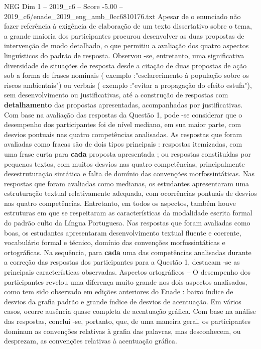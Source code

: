 \begin{textsample}{NEG Dim 1 – 2019\_c6 – Score -5.00 – 2019\_c6/enade\_2019\_eng\_amb\_0cc6810176.txt}
Apesar de o enunciado não fazer referência à exigência de elaboração de um texto dissertativo sobre o tema, a grande maioria dos participantes procurou desenvolver as duas propostas de intervenção de modo detalhado, o que permitiu a avaliação dos quatro aspectos linguísticos do padrão de resposta.
Observou -se, entretanto, uma significativa diversidade de situações de resposta desde a citação de duas propostas de ação sob a forma de frases nominais ( exemplo :"esclarecimento à população sobre os riscos ambientais") ou verbais ( exemplo :"evitar a propagação do efeito estufa"), sem desenvolvimento ou justificativas, até a construção de respostas com \textbf{detalhamento} das propostas apresentadas, acompanhadas por justificativas.
Com base na avaliação das respostas da Questão 1, pode -se considerar que o desempenho dos participantes foi de nível mediano, em sua maior parte, com desvios pontuais nas quatro competências analisadas.
As respostas que foram avaliadas como fracas são de dois tipos principais : respostas itemizadas, com uma frase curta para \textbf{cada} proposta apresentada ; ou respostas constituídas por pequenos textos, com muitos desvios nas quatro competências, principalmente desestruturação sintática e falta de domínio das convenções morfossintáticas.
Nas respostas que foram avaliadas como medianas, os estudantes apresentaram uma estruturação textual relativamente adequada, com ocorrências pontuais de desvios nas quatro competências.
Entretanto, em todos os aspectos, também houve estruturas em que se respeitaram as características da modalidade escrita formal do padrão culto da Língua Portuguesa.
Nas respostas que foram avaliadas como boas, os estudantes apresentaram desenvolvimento textual fluente e coerente, vocabulário formal e técnico, domínio das convenções morfossintáticas e ortográficas.
Na sequência, para \textbf{cada} uma das competências analisadas durante a correção das respostas dos participantes para a Questão 1, destacam -se as principais características observadas.
Aspectos ortográficos – O desempenho dos participantes revelou uma diferença muito grande nos dois aspectos analisados, como tem sido observado em edições anteriores do Enade : baixo índice de desvios da grafia padrão e grande índice de desvios de acentuação.
Em vários casos, ocorre ausência quase completa de acentuação gráfica.
Com base na análise das respostas, conclui -se, portanto, que, de uma maneira geral, os participantes dominam as convenções relativas à grafia das palavras, mas desconhecem, ou desprezam, as convenções relativas à acentuação gráfica.

\end{textsample}
